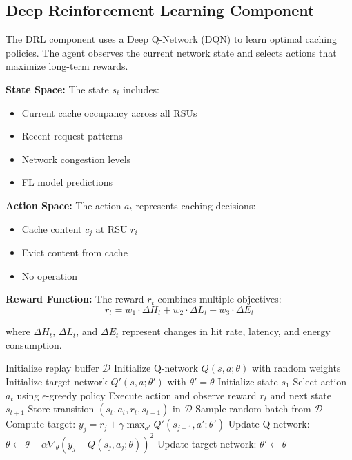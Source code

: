 \documentclass[conference]{IEEEtran}
\begin{document}
\subsection{Deep Reinforcement Learning Component}

The DRL component uses a Deep Q-Network (DQN) to learn optimal caching policies. The agent observes the current network state and selects actions that maximize long-term rewards.

\textbf{State Space:} The state $s_t$ includes:
\begin{itemize}
\item Current cache occupancy across all RSUs
\item Recent request patterns
\item Network congestion levels
\item FL model predictions
\end{itemize}

\textbf{Action Space:} The action $a_t$ represents caching decisions:
\begin{itemize}
\item Cache content $c_j$ at RSU $r_i$
\item Evict content from cache
\item No operation
\end{itemize}

\textbf{Reward Function:} The reward $r_t$ combines multiple objectives:
\begin{equation}
r_t = w_1 \cdot \Delta H_t + w_2 \cdot \Delta L_t + w_3 \cdot \Delta E_t
\end{equation}

where $\Delta H_t$, $\Delta L_t$, and $\Delta E_t$ represent changes in hit rate, latency, and energy consumption.

\begin{algorithm}
\caption{DQN Training Algorithm}
\label{alg:dqn}
\begin{algorithmic}[1]
\State Initialize replay buffer $\mathcal{D}$
\State Initialize Q-network $Q(s,a;\theta)$ with random weights
\State Initialize target network $Q'(s,a;\theta')$ with $\theta' = \theta$
    \State Initialize state $s_1$
        \State Select action $a_t$ using $\epsilon$-greedy policy
        \State Execute action and observe reward $r_t$ and next state $s_{t+1}$
        \State Store transition $(s_t, a_t, r_t, s_{t+1})$ in $\mathcal{D}$
            \State Sample random batch from $\mathcal{D}$
            \State Compute target: $y_j = r_j + \gamma \max_{a'} Q'(s_{j+1}, a'; \theta')$
            \State Update Q-network: $\theta \leftarrow \theta - \alpha \nabla_\theta (y_j - Q(s_j, a_j; \theta))^2$
        \EndIf
            \State Update target network: $\theta' \leftarrow \theta$
        \EndIf
    \EndFor
\EndFor
\end{algorithmic}
\end{algorithm}
\end{document}
